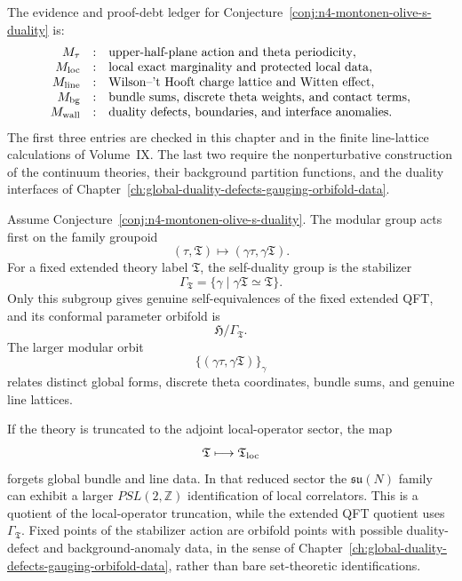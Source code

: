 The evidence and proof-debt ledger for
Conjecture~\ref{conj:n4-montonen-olive-s-duality} is:
\[
  \begin{array}{rcl}
    M_{\tau} &:& \hbox{upper-half-plane action and theta periodicity},\\
    M_{\rm loc} &:& \hbox{local exact marginality and protected local data},\\
    M_{\rm line} &:& \hbox{Wilson--'t Hooft charge lattice and Witten effect},\\
    M_{\rm bg} &:& \hbox{bundle sums, discrete theta weights, and contact terms},\\
    M_{\rm wall} &:& \hbox{duality defects, boundaries, and interface anomalies}.
  \end{array}
\]
The first three entries are checked in this chapter and in the finite
line-lattice calculations of Volume~IX.  The last two require the
nonperturbative construction of the continuum theories, their background
partition functions, and the duality interfaces of
Chapter~\ref{ch:global-duality-defects-gauging-orbifold-data}.

\begin{remark}
\label{rem:n4-duality-quotient}
Assume Conjecture~\ref{conj:n4-montonen-olive-s-duality}.  The modular group
acts first on the family groupoid
\[
  (\tau,\mathfrak T)\longmapsto(\gamma\tau,\gamma\mathfrak T).
\]
For a fixed extended theory label \(\mathfrak T\), the self-duality group is
the stabilizer
\[
  \Gamma_{\mathfrak T}
  =
  \{\gamma\mid \gamma\mathfrak T\simeq\mathfrak T\}.
\]
Only this subgroup gives genuine self-equivalences of the fixed extended QFT,
and its conformal parameter orbifold is
\[
  \mathfrak H/\Gamma_{\mathfrak T}.
\]
The larger modular orbit
\[
  \{(\gamma\tau,\gamma\mathfrak T)\}_{\gamma}
\]
relates distinct global forms, discrete theta coordinates, bundle sums, and
genuine line lattices.

If the theory is truncated to the adjoint local-operator sector, the map
\[
  \mathfrak T\longmapsto\mathfrak T_{\rm loc}
\]
forgets global bundle and line data.  In that reduced sector the
\(\mathfrak{su}(N)\) family can exhibit a larger \(PSL(2,\mathbb Z)\)
identification of local correlators.  This is a quotient of the
local-operator truncation, while the extended QFT quotient uses
\(\Gamma_{\mathfrak T}\).  Fixed points of the stabilizer action are orbifold
points with possible duality-defect and background-anomaly data, in the sense
of Chapter~\ref{ch:global-duality-defects-gauging-orbifold-data}, rather than
bare set-theoretic identifications.
\end{remark}

